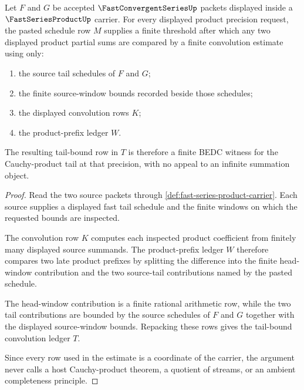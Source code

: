 \begin{theorem}
\label{thm:fast-series-product-tail-bound-convolution}
Let $F$ and $G$ be accepted $\FastConvergentSeriesUp$ packets displayed inside a $\FastSeriesProductUp$ carrier. For every displayed product precision request, the pasted schedule row $M$ supplies a finite threshold after which any two displayed product partial sums are compared by a finite convolution estimate using only:
\begin{enumerate}
\item the source tail schedules of $F$ and $G$;
\item the finite source-window bounds recorded beside those schedules;
\item the displayed convolution rows $K$;
\item the product-prefix ledger $W$.
\end{enumerate}
The resulting tail-bound row in $T$ is therefore a finite BEDC witness for the Cauchy-product tail at that precision, with no appeal to an infinite summation object.
\end{theorem}
\begin{proof}
Read the two source packets through \autoref{def:fast-series-product-carrier}. Each source supplies a displayed fast tail schedule and the finite windows on which the requested bounds are inspected.

The convolution row $K$ computes each inspected product coefficient from finitely many displayed source summands. The product-prefix ledger $W$ therefore compares two late product prefixes by splitting the difference into the finite head-window contribution and the two source-tail contributions named by the pasted schedule.

The head-window contribution is a finite rational arithmetic row, while the two tail contributions are bounded by the source schedules of $F$ and $G$ together with the displayed source-window bounds. Repacking these rows gives the tail-bound convolution ledger $T$.

Since every row used in the estimate is a coordinate of the carrier, the argument never calls a host Cauchy-product theorem, a quotient of streams, or an ambient completeness principle.
\end{proof}

